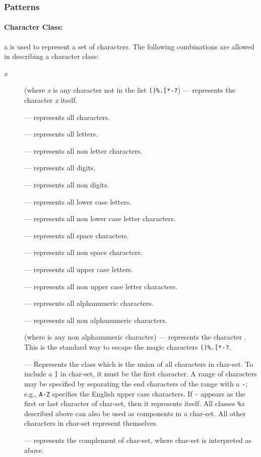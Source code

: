 \subsubsection*{Patterns} \label{pm}

\paragraph{Character Class:}
a  is used to represent a set of characters.
The following combinations are allowed in describing a character class:
\begin{description}
\item[\emph{x}] (where \emph{x} is any character not in the list \verb|()%.[*-?|)
--- represents the character \emph{x} itself.
\item[] --- represents all characters.
\item[] --- represents all letters.
\item[] --- represents all non letter characters.
\item[] --- represents all digits.
\item[] --- represents all non digits.
\item[] --- represents all lower case letters.
\item[] --- represents all non lower case letter characters.
\item[] --- represents all space characters.
\item[] --- represents all non space characters.
\item[] --- represents all upper case letters.
\item[] --- represents all non upper case letter characters.
\item[] --- represents all alphanumeric characters.
\item[] --- represents all non alphanumeric characters.
\item[] (where  is any non alphanumeric character)  ---
represents the character .
This is the standard way to escape the magic characters \verb|()%.[*-?|.
\item[] ---
Represents the class which is the union of all
characters in char-set.
To include a \verb|]| in char-set, it must be the first character.
A range of characters may be specified by
separating the end characters of the range with a \verb|-|;
e.g., \verb|A-Z| specifies the English upper case characters.
If \verb|-| appears as the first or last character of char-set,
then it represents itself.
All classes \verb|%|\emph{x} described above can also be used as
components in a char-set.
All other characters in char-set represent themselves.
\item[] ---
represents the complement of char-set,
where char-set is interpreted as above.
\end{description}

